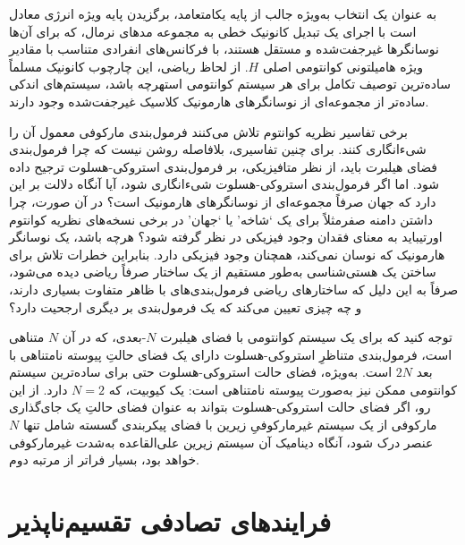 \documentclass{article}
\begin{document}
به عنوان یک انتخاب به‌ویژه جالب از پایه یکامتعامد، برگزیدن پایه ویژه انرژی معادل است با اجرای یک تبدیل کانونیک خطی به مجموعه مدهای نرمال، که برای آن‌ها نوسانگرها غیرجفت‌شده و مستقل هستند، با فرکانس‌های انفرادی متناسب با مقادیر ویژه هامیلتونی کوانتومی اصلی $H$. از لحاظ ریاضی، این چارچوب کانونیک مسلماً ساده‌ترین توصیف تکامل برای هر سیستم کوانتومی است\textemdash هرچه باشد، سیستم‌های اندکی ساده‌تر از مجموعه‌ای از نوسانگرهای هارمونیک کلاسیک غیرجفت‌شده وجود دارند.

برخی تفاسیر نظریه کوانتوم تلاش می‌کنند فرمول‌بندی مارکوفی معمول آن را شیء‌انگاری کنند. برای چنین تفاسیری، بلافاصله روشن نیست که چرا فرمول‌بندی فضای هیلبرت باید، از نظر متافیزیکی، بر فرمول‌بندی استروکی-هسلوت ترجیح داده شود. اما اگر فرمول‌بندی استروکی-هسلوت شیء‌انگاری شود، آیا آنگاه دلالت بر این دارد که جهان صرفاً مجموعه‌ای از نوسانگرهای هارمونیک است؟ در آن صورت، چرا داشتن دامنه صفر\textemdash مثلاً برای یک \textquoteleft شاخه\textquoteright{} یا \textquoteleft جهان\textquoteright{} در برخی نسخه‌های نظریه کوانتوم اورتی\textemdash باید به معنای فقدان وجود فیزیکی در نظر گرفته شود؟ هرچه باشد، یک نوسانگر هارمونیک که نوسان نمی‌کند، همچنان وجود فیزیکی دارد. بنابراین خطرات تلاش برای ساختن یک هستی‌شناسی به‌طور مستقیم از یک ساختار صرفاً ریاضی دیده می‌شود، صرفاً به این دلیل که ساختارهای ریاضی فرمول‌بندی‌های با ظاهر متفاوت بسیاری دارند، و چه چیزی تعیین می‌کند که یک فرمول‌بندی بر دیگری ارجحیت دارد؟

توجه کنید که برای یک سیستم کوانتومی با فضای هیلبرت $N$-بعدی، که در آن $N$ متناهی است، فرمول‌بندی متناظرِ استروکی-هسلوت دارای یک فضای حالتِ پیوسته نامتناهی با بعد $2N$ است. به‌ویژه، فضای حالت استروکی-هسلوت حتی برای ساده‌ترین سیستم کوانتومی ممکن نیز به‌صورت پیوسته نامتناهی است: یک کیوبیت، که $N=2$ دارد. از این رو، اگر فضای حالت استروکی-هسلوت بتواند به عنوان فضای حالتِ یک جای‌گذاری مارکوفی از یک سیستم غیرمارکوفیِ زیرین با فضای پیکربندی گسسته شامل تنها $N$ عنصر درک شود، آنگاه دینامیک آن سیستم زیرین علی‌القاعده به‌شدت غیرمارکوفی خواهد بود، بسیار فراتر از مرتبه دوم.

\section{فرایندهای تصادفی تقسیم‌ناپذیر\label{sec:Indivisible-Stochastic-Processes}}
\end{document}
